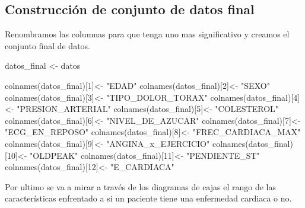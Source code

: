 \documentclass[
]{article}
\newenvironment{Shaded}{\begin{snugshade}}{\end{snugshade}}
\newcommand{\DecValTok}[1]{\textcolor[rgb]{0.86,0.86,0.80}{#1}}
\newcommand{\FunctionTok}[1]{\textcolor[rgb]{0.94,0.94,0.56}{#1}}
\newcommand{\NormalTok}[1]{\textcolor[rgb]{0.80,0.80,0.80}{#1}}
\newcommand{\OtherTok}[1]{\textcolor[rgb]{0.94,0.94,0.56}{#1}}
\newcommand{\StringTok}[1]{\textcolor[rgb]{0.80,0.58,0.58}{#1}}
\begin{document}
\hypertarget{construcciuxf3n-de-conjunto-de-datos-final}{%
\subsection{Construcción de conjunto de datos
final}\label{construcciuxf3n-de-conjunto-de-datos-final}}

Renombramos las columnas para que tenga uno mas significativo y creamos
el conjunto final de datos.

\begin{Shaded}
\begin{Highlighting}[]
\NormalTok{datos\_final }\OtherTok{\textless{}{-}}\NormalTok{ datos}

\FunctionTok{colnames}\NormalTok{(datos\_final)[}\DecValTok{1}\NormalTok{]}\OtherTok{\textless{}{-}}  \StringTok{"EDAD"}
\FunctionTok{colnames}\NormalTok{(datos\_final)[}\DecValTok{2}\NormalTok{]}\OtherTok{\textless{}{-}}  \StringTok{"SEXO"}
\FunctionTok{colnames}\NormalTok{(datos\_final)[}\DecValTok{3}\NormalTok{]}\OtherTok{\textless{}{-}}  \StringTok{"TIPO\_DOLOR\_TORAX"}
\FunctionTok{colnames}\NormalTok{(datos\_final)[}\DecValTok{4}\NormalTok{]}\OtherTok{\textless{}{-}}  \StringTok{"PRESION\_ARTERIAL"}
\FunctionTok{colnames}\NormalTok{(datos\_final)[}\DecValTok{5}\NormalTok{]}\OtherTok{\textless{}{-}}  \StringTok{"COLESTEROL"}
\FunctionTok{colnames}\NormalTok{(datos\_final)[}\DecValTok{6}\NormalTok{]}\OtherTok{\textless{}{-}}  \StringTok{"NIVEL\_DE\_AZUCAR"}
\FunctionTok{colnames}\NormalTok{(datos\_final)[}\DecValTok{7}\NormalTok{]}\OtherTok{\textless{}{-}}  \StringTok{"ECG\_EN\_REPOSO"}
\FunctionTok{colnames}\NormalTok{(datos\_final)[}\DecValTok{8}\NormalTok{]}\OtherTok{\textless{}{-}}  \StringTok{"FREC\_CARDIACA\_MAX"}
\FunctionTok{colnames}\NormalTok{(datos\_final)[}\DecValTok{9}\NormalTok{]}\OtherTok{\textless{}{-}}  \StringTok{"ANGINA\_x\_EJERCICIO"}
\FunctionTok{colnames}\NormalTok{(datos\_final)[}\DecValTok{10}\NormalTok{]}\OtherTok{\textless{}{-}} \StringTok{"OLDPEAK"}
\FunctionTok{colnames}\NormalTok{(datos\_final)[}\DecValTok{11}\NormalTok{]}\OtherTok{\textless{}{-}} \StringTok{"PENDIENTE\_ST"}
\FunctionTok{colnames}\NormalTok{(datos\_final)[}\DecValTok{12}\NormalTok{]}\OtherTok{\textless{}{-}} \StringTok{"E\_CARDIACA"}
\end{Highlighting}
\end{Shaded}

Por ultimo se va a mirar a través de los diagramas de cajas el rango de
las características enfrentado a si un paciente tiene una enfermedad
cardiaca o no.
\end{document}
